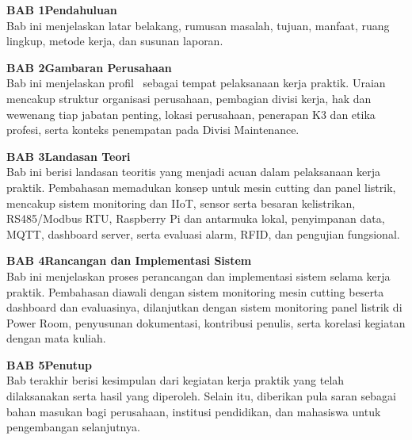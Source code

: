 
\vspace{0.3cm}
\begin{description}[leftmargin=0pt, labelsep=0pt, itemsep=4pt]
  \item[] \textbf{BAB 1}\quad \textbf{Pendahuluan}\\
    Bab ini menjelaskan latar belakang, rumusan masalah, tujuan, manfaat,
    ruang lingkup, metode kerja, dan susunan laporan.



  \item[] \textbf{BAB 2}\quad \textbf{Gambaran Perusahaan}\\
    Bab ini menjelaskan profil \NamaPerusahaan\ sebagai tempat pelaksanaan
    kerja praktik. Uraian mencakup struktur organisasi perusahaan, pembagian
    divisi kerja, hak dan wewenang tiap jabatan penting, lokasi perusahaan,
    penerapan K3 dan etika profesi, serta konteks penempatan pada Divisi Maintenance.

  \item[] \textbf{BAB 3}\quad \textbf{Landasan Teori}\\
    Bab ini berisi landasan teoritis yang menjadi acuan dalam pelaksanaan kerja
    praktik. Pembahasan memadukan konsep untuk mesin cutting dan panel listrik, mencakup sistem monitoring dan IIoT, sensor serta besaran kelistrikan, RS485/Modbus RTU, Raspberry Pi dan antarmuka lokal, penyimpanan data, MQTT, dashboard server, serta evaluasi alarm, RFID, dan pengujian fungsional.

  \item[] \textbf{BAB 4}\quad \textbf{Rancangan dan Implementasi Sistem}\\
    Bab ini menjelaskan proses perancangan dan implementasi sistem selama kerja
    praktik. Pembahasan diawali dengan sistem monitoring mesin cutting beserta
    dashboard dan evaluasinya, dilanjutkan dengan sistem monitoring panel listrik
    di Power Room, penyusunan dokumentasi, kontribusi penulis, serta korelasi
    kegiatan dengan mata kuliah.

  \item[] \textbf{BAB 5}\quad \textbf{Penutup}\\
    Bab terakhir berisi kesimpulan dari kegiatan kerja praktik yang telah
    dilaksanakan serta hasil yang diperoleh. Selain itu, diberikan pula saran
    sebagai bahan masukan bagi perusahaan, institusi pendidikan, dan mahasiswa
    untuk pengembangan selanjutnya.
\end{description}
